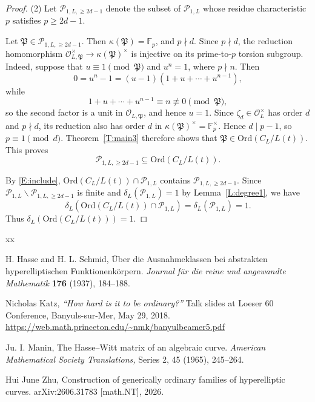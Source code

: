 \documentclass{amsart}
\theoremstyle{plain}
\theoremstyle{remark}
\newcommand{\cO}{\mathcal{O}}
\newcommand{\cP}{\mathcal{P}}
\newcommand{\Ord}{\mathrm{Ord}} %
\newcommand{\1}{\mathbf{1}}
\newcommand{\F}{\mathbb{F}}
\newcommand{\fP}{\mathfrak{P}}
\begin{document}
\begin{proof}
(2)
Let $\cP_{1,L,\ge 2d-1}$ denote the
subset of $\cP_{1,L}$ whose residue characteristic $p$ satisfies
$p\ge 2d-1$.

Let $\fP\in\cP_{1,L,\ge 2d-1}$.
Then $\kappa(\fP)=\F_p$, and $p\nmid d$.
Since $p\nmid d$, the reduction homomorphism
$\cO_{L,\fP}^\times \longrightarrow \kappa(\fP)^\times$
is injective on its prime-to-$p$ torsion subgroup.
Indeed, suppose that $u\equiv 1\pmod \fP$ and $u^n=1$, where $p\nmid n$.
Then $$0=u^n-1=(u-1)(1+u+\cdots+u^{n-1}),$$
while
\[
1+u+\cdots+u^{n-1}\equiv n \not\equiv 0 \pmod \fP,
\]
so the second factor is a unit in $\cO_{L,\fP}$, and hence $u=1$.
Since $\zeta_d\in\cO_L^\times$
has order $d$ and $p\nmid d$, its reduction also has order $d$ in
$\kappa(\fP)^\times = \F_p^\times$.
Hence
$d\mid p-1$, so
$p\equiv 1\pmod d$.
Theorem~\ref{T:main3} therefore shows that
$\fP\in\Ord(C_L/L(t))$.
This proves
\begin{equation}\label{E:include}
\cP_{1,L,\ge 2d-1}\subseteq \Ord(C_L/L(t)).
\end{equation}

By \eqref{E:include}, $\Ord(C_L/L(t))\cap\cP_{1,L}$ contains
$\cP_{1,L,\ge 2d-1}$.
Since $\cP_{1,L}\backslash \cP_{1,L,\ge 2d-1}$ is finite and $\delta_L(\cP_{1,L})=1$
by Lemma~\ref{L:degree1}, we have
\begin{equation}\label{E:fff}
\delta_L(\Ord(C_L/L(t))\cap \cP_{1,L})=\delta_L(\cP_{1,L})=1.
\end{equation}
Thus $\delta_L(\Ord(C_L/L(t)))=1$.
\end{proof}

\begin{thebibliography}{xx}


H. Hasse and H. L. Schmid,
{{\"U}ber die Ausnahmeklassen bei abstrakten
hyperelliptischen Funktionenk{\"o}rpern.}
{\it Journal f\"ur die reine und angewandte Mathematik }{\bf 176} (1937), 184--188.

Nicholas Katz,
{\it ``How hard is it to be ordinary?''}
Talk slides at
Loeser 60 Conference,
Banyuls-sur-Mer, May 29, 2018.\\
\url{https://web.math.princeton.edu/~nmk/banyulbeamer5.pdf}

Ju. I. Manin,
The Hasse--Witt matrix of an algebraic curve.
{\it American Mathematical Society Translations,} Series 2, 45 (1965), 245--264.

Hui June Zhu,
Construction of generically ordinary families of hyperelliptic curves.
arXiv:2606.31783 [math.NT], 2026.

\end{thebibliography}
\end{document}
